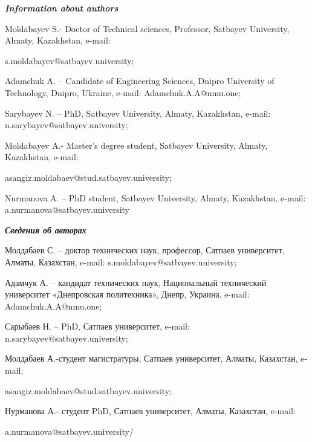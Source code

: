 \emph{{\bfseries Information about authors}}

\begin{noparindent}
Moldabayev S.- Doctor of Technical sciences, Professor, Satbayev
University, Almaty, Kazakhstan, e-mail:

s.moldabayev@satbayev.university;

Adamchuk A. -- Candidate of Engineering Sciences, Dnipro University of
Technology, Dnipro, Ukraine, e-mail: Adamchuk.A.A@nmu.one;

Sarybayev N. -- PhD, Satbayev University, Almaty, Kazakhstan, e-mail:
n.sarybayev@satbayev.university;

Moldabayev A.- Master's degree student, Satbayev University, Almaty,
Kazakhstan, e-mail:

asangiz.moldabaev@stud.satbayev.university;

Nurmanova A. -- PhD student, Satbayev University, Almaty, Kazakhstan,
e-mail: a.nurmanova@satbayev.university
\end{noparindent}

\emph{{\bfseries Сведения об авторах}}

\begin{noparindent}
Молдабаев С. -- доктор технических наук, профессор, Сатпаев университет,
Алматы, Казахстан, e-mail: s.moldabayev@satbayev.university;

Адамчук А. -- кандидат технических наук, Национальный технический
университет «Днепровская политехника», Днепр, Украина, e-mail:
Adamchuk.A.A@nmu.one;

Сарыбаев Н. -- PhD, Сатпаев университет, e-mail:
n.sarybayev@satbayev.university;

Молдабаев А.-студент магистратуры, Сатпаев университет, Алматы,
Казахстан, e-mail:

asangiz.moldabaev@stud.satbayev.university;

Нурманова А.- студент PhD, Сатпаев университет, Алматы, Казахстан,
e-mail:

a.nurmanova@satbayev.university/
\end{noparindent}
